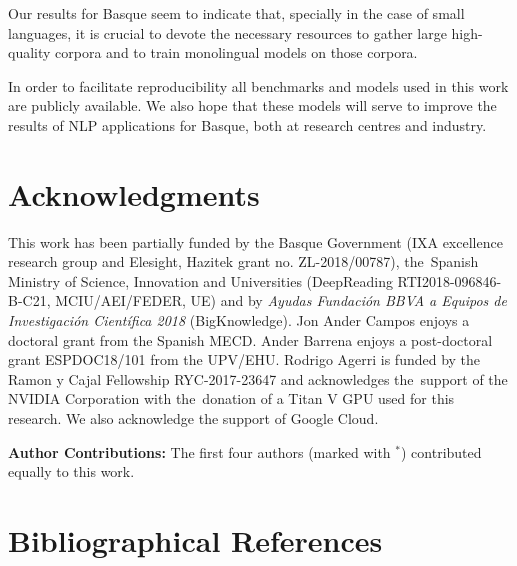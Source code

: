 \documentclass[10pt, a4paper]{article}
\begin{document}
Our results for Basque seem to indicate that, specially in the case of small languages, it is crucial to devote the necessary resources to gather large high-quality corpora and to train monolingual models on those corpora.

In order to facilitate reproducibility all benchmarks and models used in this work are publicly available. We also hope that these models will serve to improve the results of NLP applications for Basque, both at research centres and industry.



\section{Acknowledgments}

This work has been partially funded by the Basque Government (IXA excellence research group and Elesight, Hazitek grant no. ZL-2018/00787), the~Spanish Ministry of Science, Innovation and Universities (DeepReading RTI2018-096846-B-C21, MCIU/AEI/FEDER, UE) and by \textit{Ayudas Fundación BBVA a Equipos de Investigación Científica 2018} (BigKnowledge).  Jon Ander Campos enjoys a doctoral grant from the Spanish MECD. Ander Barrena enjoys a post-doctoral grant ESPDOC18/101 from the UPV/EHU. Rodrigo Agerri is funded by the Ramon y Cajal Fellowship RYC-2017-23647 and acknowledges the~support of the NVIDIA Corporation with the~donation of a Titan V GPU used for this research. We also acknowledge the support of Google Cloud.

\vspace{0.5cm}

\noindent \textbf{Author Contributions:} The first four authors (marked with $^{*}$) contributed equally to this work.

\section{Bibliographical References}



\end{document}
